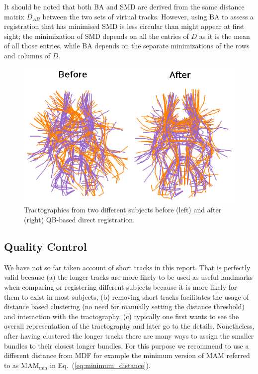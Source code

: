 \documentclass{bioinfo}
\begin{document}
It should be noted that both BA and SMD are derived from the same
distance matrix $D_{AB}$ between the two sets of virtual
tracks. However, using BA to assess a registration that has minimised
SMD is less circular than might appear at first sight; the minimization
of SMD depends on all the entries of $D$ as it is the mean of all those
entries, while BA depends on the separate minimizations of the rows and
columns of $D$.

\begin{figure}
\begin{centering}
\includegraphics[scale=1.0]{Figures/Fig_9_QB_registration2_only_landscape}
\par\end{centering}
\caption{Tractographies from two different subjects
  before (left) and after (right) QB-based direct registration.\label{Flo:direct_registration}}
\end{figure}

\subsection{Quality Control\label{sub:short_tracks}}

We have not so far taken account of short tracks in this report. That
is perfectly valid because (a) the longer tracks are more likely to
be used as useful landmarks when comparing or registering different
subjects because it is more likely for them to exist in most subjects,
(b) removing short tracks facilitates the usage of distance based
clustering (no need for manually setting the distance threshold) and
interaction with the tractography, (c) typically one first wants to
see the overall representation of the tractography and later go to
the details. Nonetheless, after having clustered the longer tracks
there are many ways to assign the smaller bundles to their closest
longer bundles. For this purpose we recommend to use a different distance
from MDF for example the minimum version of MAM referred
to as $\textrm{MAM}_{\textrm{min}}$ in Eq.~(\ref{eq:minimum_distance}). 
\end{document}
